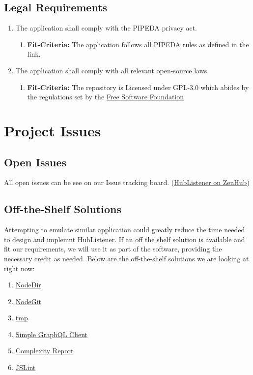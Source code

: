 \documentclass{article}
\begin{document}
\subsection{Legal Requirements}
\begin{enumerate}
\item The application shall comply with the PIPEDA privacy act.
   \begin{enumerate}
    \item \textbf{Fit-Criteria:}  The application follows all  \href{https://www.priv.gc.ca/en/privacy-topics/privacy-laws-in-canada/the-personal-information-protection-and-electronic-documents-act-pipeda/}{PIPEDA} rules as defined in the link.
    \end{enumerate}
\item The application shall comply with all relevant open-source laws. 
   \begin{enumerate}
    \item \textbf{Fit-Criteria:}  The repository is Licensed under GPL-3.0 which abides by the regulations set by the \href{https://www.fsf.org/}{Free Software Foundation} 
    \end{enumerate}
\end{enumerate}

\newpage
\section{Project Issues }
\subsection{Open Issues}
All open issues can be see on our Issue tracking board. (\href{ https://app.zenhub.com/workspaces/hublistener-5bad6c4d4b5806bc2bea488f/boards?repos=150634456}{HubListener on ZenHub})
\subsection{Off-the-Shelf Solutions}
Attempting to emulate similar application could greatly reduce the time needed to design and implemnt HubListener. If an off the shelf solution is available and fit our requirements, we will use it as part of the software, providing the necessary credit as needed. Below are the off-the-shelf solutions we are looking at right now:

\begin{enumerate}

\item  \href{https://www.npmjs.com/package/node-dir}{NodeDir} 
\item  \href{https://www.npmjs.com/package/nodegit}{NodeGit}
\item  \href{https://www.npmjs.com/package/tmp}{tmp} 
\item  \href{https://www.npmjs.com/package/graphql-client}{Simple GraphQL Client} 
\item  \href{https://www.npmjs.com/package/complexity-report#complexity-metrics}{Complexity Report} 
\item \href{https://www.npmjs.com/package/jslint}{JSLint}

\end{enumerate}
\end{document}
